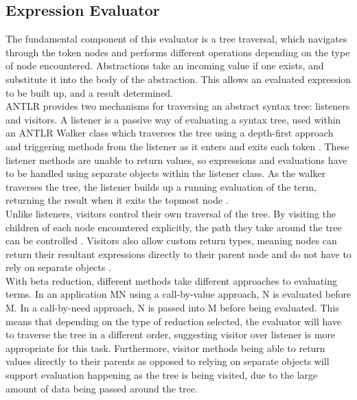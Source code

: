 \documentclass[a4paper,11pt]{report}
\begin{document}
\subsection{Expression Evaluator}

The fundamental component of this evaluator is a tree traversal, which navigates through the token nodes and performs different operations depending on the type of node encountered. Abstractions take an incoming value if one exists, and substitute it into the body of the abstraction. This allows an evaluated expression to be built up, and a result determined.\\

ANTLR provides two mechanisms for traversing an abstract syntax tree: listeners and visitors. A listener is a passive way of evaluating a syntax tree, used within an ANTLR Walker class which traverses the tree using a depth-first approach and triggering methods from the listener as it enters and exits each token \cite{Parr2012}. These listener methods are unable to return values, so expressions and evaluations have to be handled using separate objects within the listener class. As the walker traverses the tree, the listener builds up a running evaluation of the term, returning the result when it exits the topmost node \cite{Srivastav2017}.\\

Unlike listeners, visitors control their own traversal of the tree. By visiting the children of each node encountered explicitly, the path they take around the tree can be controlled \cite{Parr2012}. Visitors also allow custom return types, meaning nodes can return their resultant expressions directly to their parent node and do not have to rely on separate objects \cite{Srivastav2017}.\\

With beta reduction, different methods take different approaches to evaluating terms. In an application MN using a call-by-value approach, N is evaluated before M. In a call-by-need approach, N is passed into M before being evaluated. This means that depending on the type of reduction selected, the evaluator will have to traverse the tree in a different order, suggesting visitor over listener is more appropriate for this task. Furthermore, visitor methods being able to return values directly to their parents as opposed to relying on separate objects will support evaluation happening as the tree is being visited, due to the large amount of data being passed around the tree.\\
\end{document}
